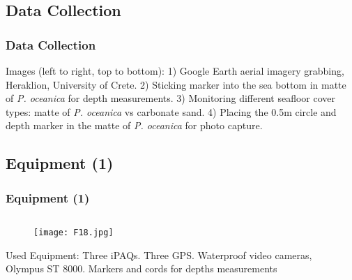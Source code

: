 \documentclass[pdflatex,compress,9pt,
	xcolor={dvipsnames,dvipsnames,svgnames,x11names,table},
	hyperref={colorlinks = true,breaklinks = true, urlcolor = NavyBlue, breaklinks = true}]{beamer}
\begin{document}
\subsection{Data Collection}
\begin{frame}\frametitle{Data Collection}
\tiny{Images (left to right, top to bottom): 1) Google Earth aerial imagery grabbing, Heraklion, University of Crete. 2) Sticking marker into the sea bottom in matte of \emph{P. oceanica} for depth measurements. 3)  Monitoring different seafloor cover types: matte of \emph{P. oceanica} vs carbonate sand. 4) Placing the 0.5m circle and depth marker in the matte of \emph{P. oceanica} for photo capture}.
\begin{figure}[H]
	\centering
			\hspace{1mm}
\end{figure}
\begin{figure}[H]
	\centering
			\hspace{1mm}
\end{figure}
\end{frame}

\subsection{Equipment (1)}
\begin{frame}\frametitle{Equipment (1)}
\begin{minipage}[0.4\textheight]{\textwidth}
\begin{columns}[T]
\begin{column}{0.5\textwidth}
\vspace{1em}
\begin{figure}[H]
	\centering
		\texttt{[image: F18.jpg]}
\end{figure}
\small{Used Equipment: Three iPAQs. Three \ac{GPS}. Waterproof video cameras, Olympus ST 8000. Markers and cords for depths measurements}
\end{column}
\begin{column}{0.5\textwidth}
\begin{figure}[H]
	\centering
			\vspace{1mm}
			\vspace{1mm}
\end{figure}
\end{column}
\end{columns}
\end{minipage}
\end{frame}
\end{document}
